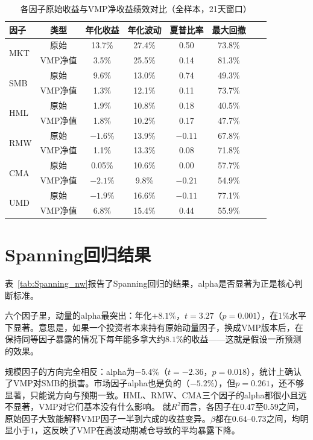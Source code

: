 \documentclass[
    decl-page,
    oneside,
  ]{njuthesis}
\begin{document}
\begin{table}[htbp]
  \centering
  \caption{各因子原始收益与VMP净收益绩效对比（全样本，21天窗口）}
  \label{tab:perf_summary}
  \begin{tabular}{lccccccc}
    \toprule
    因子 & 类型 & 年化收益 & 年化波动 & 夏普比率 & 最大回撤 \\
    \midrule
    \multirow{2}{*}{MKT} & 原始 & 13.7\% & 27.4\% & 0.50 & 73.8\% \\
                          & VMP净值 & 3.5\% & 25.5\% & 0.14 & 81.3\% \\
    \midrule
    \multirow{2}{*}{SMB} & 原始 & 9.6\% & 13.0\% & 0.74 & 49.3\% \\
                          & VMP净值 & 1.3\% & 12.1\% & 0.11 & 73.7\% \\
    \midrule
    \multirow{2}{*}{HML} & 原始 & 1.9\% & 10.8\% & 0.18 & 40.5\% \\
                          & VMP净值 & 1.8\% & 10.2\% & 0.17 & 47.7\% \\
    \midrule
    \multirow{2}{*}{RMW} & 原始 & $-1.6\%$ & 13.9\% & $-0.11$ & 67.8\% \\
                          & VMP净值 & 1.1\% & 13.3\% & 0.08 & 71.8\% \\
    \midrule
    \multirow{2}{*}{CMA} & 原始 & 0.05\% & 10.6\% & 0.00 & 57.7\% \\
                          & VMP净值 & $-2.1\%$ & 9.8\% & $-0.21$ & 54.9\% \\
    \midrule
    \multirow{2}{*}{UMD} & 原始 & $-1.9\%$ & 16.6\% & $-0.11$ & 77.1\% \\
                          & VMP净值 & 6.8\% & 15.4\% & 0.44 & 55.9\% \\
    \bottomrule
  \end{tabular}
\end{table}

\section{Spanning回归结果}

表~\ref{tab:Spanning_nw}报告了Spanning回归的结果，alpha是否显著为正是核心判断标准。

六个因子里，动量的alpha最突出：年化$+8.1\%$，$t = 3.27$（$p = 0.001$），在$1\%$水平下显著。意思是，如果一个投资者本来持有原始动量因子，换成VMP版本后，在保持同等因子暴露的情况下每年能多拿大约$8.1\%$的收益——这就是假设一所预测的效果。

规模因子的方向完全相反：alpha为$-5.4\%$（$t = -2.36$，$p = 0.018$），统计上确认了VMP对SMB的损害。市场因子alpha也是负的（$-5.2\%$），但$p = 0.261$，还不够显著，只能说方向与预期一致。HML、RMW、CMA三个因子的alpha都很小且远不显著，VMP对它们基本没有什么影响。
就$R^2$而言，各因子在$0.47$至$0.59$之间，原始因子大致能解释VMP因子一半到六成的收益变异。$\beta$都在$0.64$--$0.73$之间，均明显小于$1$，这反映了VMP在高波动期减仓导致的平均暴露下降。
\end{document}
